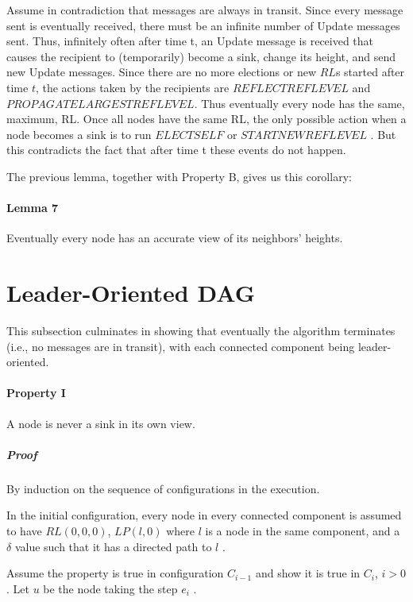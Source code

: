 Assume in contradiction that messages are always in transit. Since every message sent is eventually received, there must be an infinite number of Update messages sent. Thus, infinitely often after time t, an Update message is received that causes the recipient to (temporarily) become a sink, change its height, and send new Update messages. Since there are no more elections or new $RL$s started after time $t$, the actions taken by the recipients are $REFLECTREFLEVEL$ and $PROPAGATELARGESTREFLEVEL$. Thus eventually every node has the same, maximum, RL. Once all nodes have the same RL, the only possible action when a node becomes a sink is to run $ELECTSELF$ or $STARTNEWREFLEVEL$ . But this contradicts the fact that after time t these events do not happen.

The previous lemma, together with Property B, gives us this corollary:

\paragraph{Lemma 7}Eventually every node has an accurate view of its neighbors’ heights.
\section{Leader-Oriented DAG}
This subsection culminates in showing that eventually the algorithm terminates (i.e., no messages are in transit), with each connected component being leader-oriented.

\paragraph{Property I} A node is never a sink in its own view.
\subparagraph{Proof}By induction on the sequence of configurations in the execution.

In the initial configuration, every node in every connected component is assumed to have $RL(0,0,0)$, $LP (l, 0)$ where $l$ is a node in the same component, and a $\delta$ value such that it has a directed path to $l$	.

Assume the property is true in configuration $C_{i-1}$ and show it is true in $C_i$, $i > 0$. Let $u$ be the node taking the step $e_i$ .

